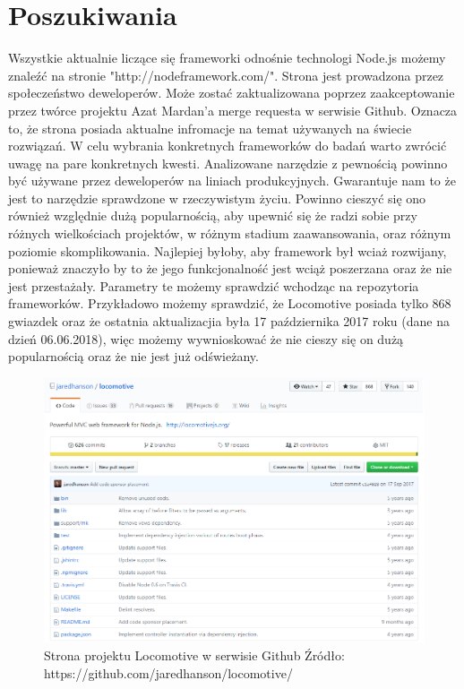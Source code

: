 \documentclass[12pt]{report}
\begin{document}
  \section{Poszukiwania}
    Wszystkie aktualnie liczące się frameworki odnośnie technologi Node.js możemy znaleźć na stronie "http://nodeframework.com/".
    Strona jest prowadzona przez społeczeństwo deweloperów.
    Może zostać zaktualizowana poprzez zaakceptowanie przez twórce projektu Azat Mardan'a merge requesta w serwisie Github.
    Oznacza to, że strona posiada aktualne infromacje na temat używanych na świecie rozwiązań.
    W celu wybrania konkretnych frameworków do badań warto zwrócić uwagę na pare konkretnych kwesti.
    Analizowane narzędzie z pewnością powinno być używane przez deweloperów na liniach produkcyjnych.
    Gwarantuje nam to że jest to narzędzie sprawdzone w rzeczywistym życiu.
    Powinno cieszyć się ono również względnie dużą popularnością, aby upewnić się że radzi sobie przy różnych wielkościach projektów, w różnym stadium zaawansowania, oraz różnym poziomie skomplikowania.
    Najlepiej byłoby, aby framework był wciaż rozwijany, ponieważ znaczyło by to że jego funkcjonalność jest wciąż poszerzana oraz że nie jest przestażały.
    Parametry te możemy sprawdzić wchodząc na repozytoria frameworków.
    Przykładowo możemy sprawdzić, że Locomotive posiada tylko 868 gwiazdek oraz że ostatnia aktualizacjia była 17 października 2017 roku (dane na dzień 06.06.2018), więc możemy wywnioskować że nie cieszy się on dużą popularnością oraz że nie jest już odświeżany.
    \begin{figure}[!hb]
      \centering
      \includegraphics[width=\textwidth,height=\textheight,keepaspectratio]{locomotive.png} 
      \caption{Strona projektu Locomotive w serwisie Github \newline Źródło: https://github.com/jaredhanson/locomotive/}
    \end{figure}
\end{document}
